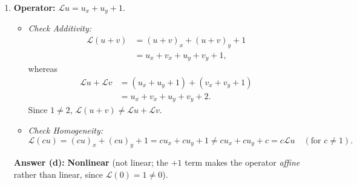 \documentclass[11pt,a4paper]{article}
\begin{document}
\begin{enumerate}[label=(\alph*)]
    \item \textbf{Operator:} $\mathcal{L}u = u_x + u_y + 1$.
    \begin{itemize}
        \item \emph{Check Additivity:}
        \begin{align*}
            \mathcal{L}(u + v) &= (u + v)_x + (u + v)_y + 1 \\
            &= u_x + v_x + u_y + v_y + 1,
        \end{align*}
        whereas
        \begin{align*}
            \mathcal{L}u + \mathcal{L}v &= (u_x + u_y + 1) + (v_x + v_y + 1) \\
            &= u_x + v_x + u_y + v_y + 2.
        \end{align*}
        Since $1 \neq 2$, $\mathcal{L}(u + v) \neq \mathcal{L}u + \mathcal{L}v$.
        \item \emph{Check Homogeneity:}
        \[
            \mathcal{L}(cu) = (cu)_x + (cu)_y + 1 = c u_x + c u_y + 1 \neq c u_x + c u_y + c = c\mathcal{L}u \quad (\text{for } c \neq 1).
        \]
    \end{itemize}
    \textbf{Answer (d):} \textbf{Nonlinear} (not linear; the $+1$ term makes the operator \emph{affine} rather than linear, since $\mathcal{L}(0) = 1 \neq 0$).


\end{enumerate}
\end{document}
